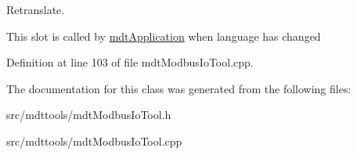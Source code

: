 Retranslate. 

This slot is called by \hyperlink{classmdt_application}{mdtApplication} when language has changed 

Definition at line 103 of file mdtModbusIoTool.cpp.



The documentation for this class was generated from the following files:\begin{DoxyCompactItemize}
\item 
src/mdttools/mdtModbusIoTool.h\item 
src/mdttools/mdtModbusIoTool.cpp\end{DoxyCompactItemize}

